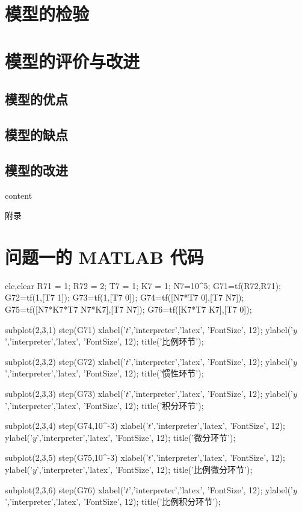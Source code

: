 \documentclass{MathorCupmodeling}
\begin{document}
	\section{模型的检验}
	\zhlipsum*[15]

	\section{模型的评价与改进}
	\zhlipsum*[16]
	\subsection{模型的优点}
	\zhlipsum*[17]
	\subsection{模型的缺点}
	\zhlipsum*[18]
	\subsection{模型的改进}
	\zhlipsum*[19]\cite{label}

	\begin{thebibliography}{99}
	content
	\end{thebibliography}

	\newpage
	\appendix
	\begin{center}
		\heiti{} 附\hspace{1pc}录
	\end{center}
	\section{问题一的 MATLAB 代码}
	\begin{matlab}
clc,clear
R71 = 1;
R72 = 2;
T7 = 1;
K7 = 1;
N7=10^5;
G71=tf(R72,R71);
G72=tf(1,[T7 1]);
G73=tf(1,[T7 0]);
G74=tf([N7*T7 0],[T7 N7]);
G75=tf([N7*K7*T7 N7*K7],[T7 N7]);
G76=tf([K7*T7 K7],[T7 0]);

subplot(2,3,1)
step(G71)
xlabel('$t$','interpreter','latex', 'FontSize', 12);
ylabel('$y$','interpreter','latex', 'FontSize', 12);
title('比例环节');

subplot(2,3,2)
step(G72)
xlabel('$t$','interpreter','latex', 'FontSize', 12);
ylabel('$y$','interpreter','latex', 'FontSize', 12);
title('惯性环节');

subplot(2,3,3)
step(G73)
xlabel('$t$','interpreter','latex', 'FontSize', 12);
ylabel('$y$','interpreter','latex', 'FontSize', 12);
title('积分环节');

subplot(2,3,4)
step(G74,10^-3)
xlabel('$t$','interpreter','latex', 'FontSize', 12);
ylabel('$y$','interpreter','latex', 'FontSize', 12);
title('微分环节');

subplot(2,3,5)
step(G75,10^-3)
xlabel('$t$','interpreter','latex', 'FontSize', 12);
ylabel('$y$','interpreter','latex', 'FontSize', 12);
title('比例微分环节');

subplot(2,3,6)
step(G76)
xlabel('$t$','interpreter','latex', 'FontSize', 12);
ylabel('$y$','interpreter','latex', 'FontSize', 12);
title('比例积分环节');
	\end{matlab}
\end{document}
